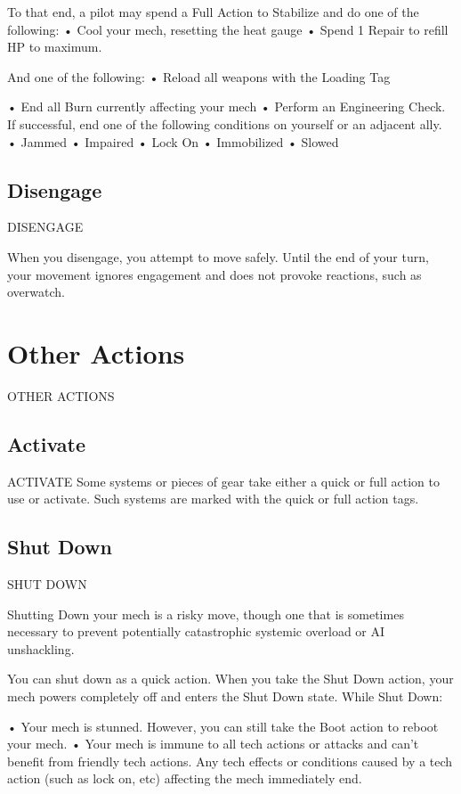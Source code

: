 To that end, a pilot may spend a Full Action to Stabilize and do one of the following:
•  Cool your mech, resetting the heat gauge
•  Spend 1 Repair to refill HP to maximum.

And one of the following:
•  Reload all weapons with the Loading Tag




•  End all Burn currently affecting your mech
•  Perform an Engineering Check. If successful, end one of the following conditions on yourself
  or an adjacent ally.
             •  Jammed
             •  Impaired
             •  Lock On
             •  Immobilized
             •  Slowed
\subsection{Disengage}
                                            DISENGAGE

When you disengage, you attempt to move safely. Until the end of your turn, your movement
ignores engagement and does not provoke reactions, such as overwatch.

\section{Other Actions} OTHER ACTIONS
\subsection{Activate}
                                             ACTIVATE
Some systems or pieces of gear take either a quick or full action to use or activate. Such
systems are marked with the quick or full action tags.

\subsection{Shut Down}
                                           SHUT DOWN

Shutting Down your mech is a risky move, though one that is sometimes necessary to prevent
potentially catastrophic systemic overload or AI unshackling.

You can shut down as a quick action. When you take the Shut Down action, your mech powers
completely off and enters the Shut Down state. While Shut Down:

       •  Your mech is stunned. However, you can still take the Boot action to reboot your mech.
       •  Your mech is immune to all tech actions or attacks and can’t benefit from friendly tech
         actions. Any tech effects or conditions caused by a tech action (such as lock on, etc)
         affecting the mech immediately end.


